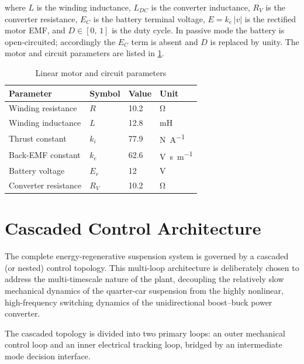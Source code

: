 where $L$ is the winding inductance, $L_{DC}$ is the converter
inductance, $R_V$ is the converter resistance, $E_C$ is the battery
terminal voltage, $E = k_e\,|v|$ is the rectified motor EMF, and
$D \in [0,\,1]$ is the duty cycle. In passive mode the battery is
open-circuited; accordingly the $E_C$ term is absent and $D$ is
replaced by unity. The motor and circuit parameters are listed in
\cref{tab:motor_params}.

\begin{table}[htbp]
    \centering
    \caption{Linear motor and circuit parameters}
    \label{tab:motor_params}
    \renewcommand{\arraystretch}{1.3}
    \begin{tabular}{llll}
        \toprule
        Parameter & Symbol & Value & Unit \\
        \midrule
        Winding resistance    & $R$    & 10.2  & \si{\ohm}              \\
        Winding inductance    & $L$    & 12.8  & \si{\milli\henry}      \\
        Thrust constant       & $k_i$  & 77.9  & \si{\newton\per\ampere}\\
        Back-EMF constant     & $k_e$  & 62.6  
            & \si{\volt\second\per\metre}                               \\
        Battery voltage       & $E_r$  & 12    & \si{\volt}             \\
        Converter resistance  & $R_V$  & 10.2  & \si{\ohm}              \\
        \bottomrule
    \end{tabular}
\end{table}

\section{Cascaded Control Architecture}
\label{sec:cascaded_topology}

The complete energy-regenerative suspension system is governed by a cascaded (or nested) control topology. This multi-loop architecture is deliberately chosen to address the multi-timescale nature of the plant, decoupling the relatively slow mechanical dynamics of the quarter-car suspension from the highly nonlinear, high-frequency switching dynamics of the unidirectional boost--buck power converter. 

The cascaded topology is divided into two primary loops: an outer mechanical control loop and an inner electrical tracking loop, bridged by an intermediate mode decision interface.

